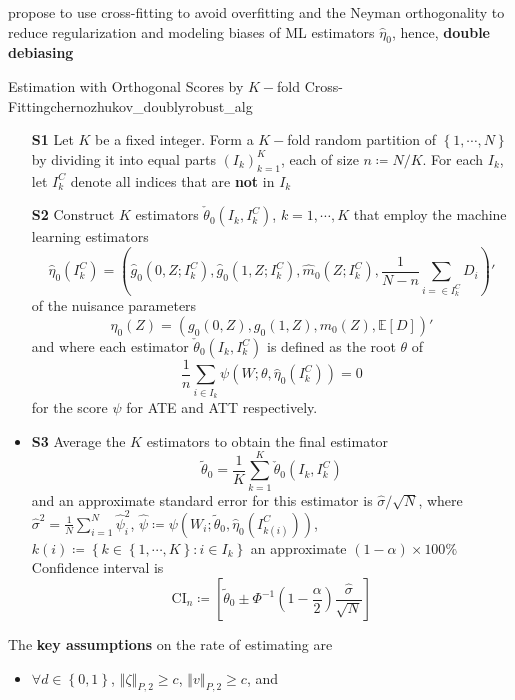 \documentclass[twoside]{article}
\begin{document}
\citet{chernozhukov2017double} propose to use cross-fitting to avoid overfitting and the Neyman orthogonality to reduce regularization and modeling biases of ML estimators $\hat{\eta}_0$, hence, \textbf{double debiasing}
\begin{algorithm}{Estimation with Orthogonal Scores by $K-$fold Cross-Fitting}{chernozhukov_doublyrobust_alg}
    \begin{itemize}
        \item[\textbf{S1}] Let $K$ be a fixed integer. Form a $K-$fold random partition of $\left\{1,\cdots,N\right\}$ by dividing it into equal parts $\left(I_k\right)^K_{k=1}$, each of size $n\coloneq N/K$. For each $I_k$, let $I^C_k$ denote all indices that are \textbf{not} in $I_k$
        \item[\textbf{S2}] Construct $K$ estimators
        $\check{\theta}_0\left(I_k,I^C_k\right)$, $k=1,\cdots,K$
        that employ the machine learning estimators 
        $$
        \hat{\eta}_0\left(I^C_k\right) = \left( \hat{g}_0\left(0,Z;I^C_k\right),\hat{g}_0\left(1,Z;I^C_k\right),\hat{m}_0\left(Z;I^C_k\right),\frac{1}{N-n}\sum_{i=\in I^C_k}D_i \right)'
        $$
        of the nuisance parameters $$ \eta_0(Z) = \left(g_0(0,Z),g_0(1,Z),m_0(Z),\mathbb{E}\left[D\right]\right)' $$
        and where each estimator $\check{\theta}_0\left(I_k,I^C_k\right)$ is defined as the root $\theta$ of $$ \frac{1}{n}\sum_{i\in I_k}\psi \left(W;\theta,\hat{\eta}_0\left(I^C_k\right)\right) =0 $$
        for the score $\psi$ for ATE and ATT respectively.
        \item{\textbf{S3}} Average the $K$ estimators to obtain the final estimator $$ \tilde{\theta}_0 = \frac{1}{K}\sum^K_{k=1}\check{\theta}_0\left(I_k,I^C_k\right) $$
        and an approximate standard error for this estimator is $\hat{\sigma}/\sqrt{N}$, where
        $\hat{\sigma}^2 = \frac{1}{N}\sum^N_{i=1}\hat{\psi}^2_i$, $\hat{\psi}\coloneq \psi\left(W_i;\tilde{\theta}_0,\hat{\eta}_0\left(I^C_{k(i)}\right)\right)$, $k(i) \coloneq \left\{k\in \left\{1,\cdots,K\right\}:i\in I_k\right\}$
        an approximate $\left(1-\alpha\right)\times 100\%$ Confidence interval is $$ \mathrm{CI}_n \coloneq \left[\tilde{\theta}_0 \pm \Phi^{-1}\left(1-\frac{\alpha}{2}\right)\frac{\hat{\sigma}}{\sqrt{N}} \right] $$
    \end{itemize}
    The \textbf{key assumptions} on the rate of estimating are 
    \begin{itemize}
        \item $\forall d\in\left\{0,1\right\}$, $\left\Vert \zeta \right\Vert _{P,2}\geq c$, $\left\Vert v \right\Vert _{P,2}\geq c$, and

\end{itemize}
\end{algorithm}
\end{document}
